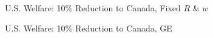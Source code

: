 \documentclass[9pt,pdftex,aspectratio=1610]{beamer}
\theoremstyle{definition}
\begin{document}
\begin{frame}[t]{U.S. Welfare: 10\% Reduction to Canada, {\color{red} Fixed $R$ \& $w$} }
\begin{figure}[t]
\end{figure}
\end{frame}

\begin{frame}[t]{U.S. Welfare: 10\% Reduction to Canada, {\color{red} GE } }
\begin{figure}[!t]
\end{figure}
\end{frame}
\end{document}
